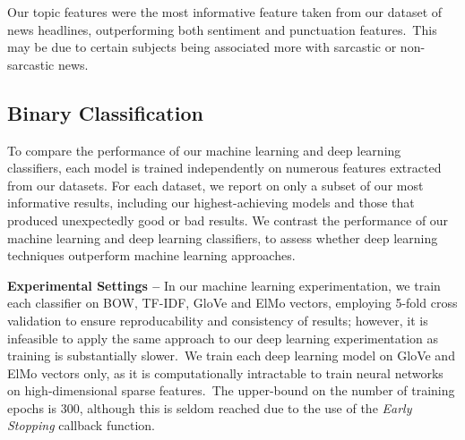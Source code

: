 \documentclass[12pt,a4paper]{article}
\begin{document}
\noindent Our topic features were the most informative feature taken from our dataset of news headlines, outperforming both sentiment and punctuation features.\ This may be due to certain subjects being associated more with sarcastic or non-sarcastic news.



\subsection{Binary Classification}\vspace{-5pt}
\noindent To compare the performance of our machine learning and deep learning classifiers, each model is trained independently on numerous features extracted from our datasets. For each dataset, we report on only a subset of our most informative results, including our highest-achieving models and those that produced unexpectedly good or bad results. We contrast the performance of our machine learning and deep learning classifiers, to assess whether deep learning techniques outperform machine learning approaches.\\\vspace{-4pt}


\noindent \textbf{Experimental Settings --} In our machine learning experimentation, we train each classifier on BOW, TF-IDF, GloVe and ElMo vectors, employing 5-fold cross validation to ensure reproducability and consistency of results; however, it is infeasible to apply the same approach to our deep learning experimentation as training is substantially slower.\ We train each deep learning model on GloVe and ElMo vectors only, as it is computationally intractable to train neural networks on high-dimensional sparse features.\ The upper-bound on the number of training epochs is 300, although this is seldom reached due to the use of the \textit{Early Stopping} callback function.\\\vspace{-10pt}

\\\vspace{-10pt}
\end{document}
